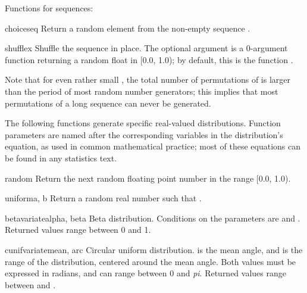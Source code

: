 Functions for sequences:

\begin{funcdesc}{choice}{seq}
  Return a random element from the non-empty sequence .
\end{funcdesc}

\begin{funcdesc}{shuffle}{x}
  Shuffle the sequence  in place.
  The optional argument  is a 0-argument function
  returning a random float in [0.0, 1.0); by default, this is the
  function .

  Note that for even rather small , the total
  number of permutations of  is larger than the period of most
  random number generators; this implies that most permutations of a
  long sequence can never be generated.
\end{funcdesc}


The following functions generate specific real-valued distributions.
Function parameters are named after the corresponding variables in the
distribution's equation, as used in common mathematical practice; most of
these equations can be found in any statistics text.

\begin{funcdesc}{random}{}
  Return the next random floating point number in the range [0.0, 1.0).
\end{funcdesc}

\begin{funcdesc}{uniform}{a, b}
  Return a random real number  such that
  .
\end{funcdesc}

\begin{funcdesc}{betavariate}{alpha, beta}
  Beta distribution.  Conditions on the parameters are
   and .
  Returned values range between 0 and 1.
\end{funcdesc}

\begin{funcdesc}{cunifvariate}{mean, arc}
  Circular uniform distribution.   is the mean angle, and
   is the range of the distribution, centered around the mean
  angle.  Both values must be expressed in radians, and can range
  between 0 and \emph{pi}.  Returned values range between
   and .
\end{funcdesc}

